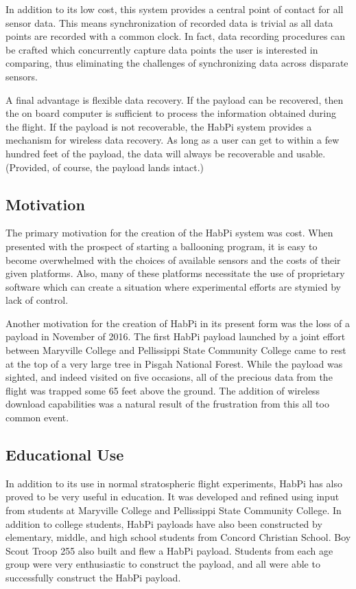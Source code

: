 \documentclass[journal]{new-aiaa}
\begin{document}
In addition to its low cost, this system provides a central point of
contact for all sensor data.  This means synchronization of recorded
data is trivial as all data points are recorded with a common
clock.  In fact, data recording procedures can be crafted which
concurrently capture data points the user is interested in comparing,
thus eliminating the challenges of synchronizing data across disparate
sensors.

A final advantage is flexible data recovery.
If the payload can be recovered, then the on board computer is
sufficient to process the information obtained during the flight.  If
the payload is not recoverable, the HabPi system provides a mechanism
for wireless data recovery.  As long as a user can
get to within a few hundred feet of the payload, the data will always be
recoverable and usable. (Provided, of course, the payload lands
intact.)

\subsection{Motivation}
The primary motivation for the creation of the HabPi system was cost.
When presented with the prospect of starting a ballooning program, it
is easy to become overwhelmed with the choices of available sensors
and the costs of their given platforms.  Also, many of these platforms
necessitate the use of proprietary software which can create
a situation where experimental efforts are stymied by lack of control.

Another motivation for the creation of HabPi in its present form was
the loss of a payload in November of 2016.  The first HabPi payload launched
by a joint effort between Maryville College and Pellissippi State
Community College came to rest at the top of a very large tree in
Pisgah National Forest.  While the payload was sighted, and indeed
visited on five occasions, all of the precious data from the flight
was trapped some 65 feet above the ground.  The addition of wireless
download capabilities was a natural result of the frustration from
this all too common event.

\subsection{Educational Use}
In addition to its use in normal stratospheric flight experiments,
HabPi has also proved to be very useful in education.  It was
developed and refined using input from students at Maryville College
and Pellissippi State Community College.  In addition to college
students, HabPi payloads have also been constructed by elementary,
middle, and high school students from Concord Christian School.  Boy
Scout Troop 255 also built and flew a HabPi payload. Students from
each age group were very enthusiastic to construct the payload, and
all were able to successfully construct the HabPi payload.
\end{document}
